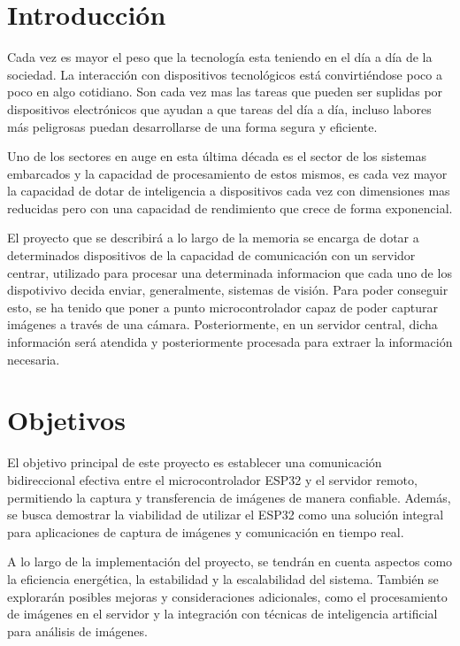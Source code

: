 
\section{Introducción}
Cada vez es mayor el peso que la tecnología esta teniendo en el día a día de la sociedad. La interacción con dispositivos tecnológicos está convirtiéndose poco a poco en algo cotidiano. Son cada vez mas las tareas que pueden ser suplidas por dispositivos electrónicos que ayudan a que tareas del día a día, incluso labores más peligrosas puedan desarrollarse de una forma segura y eficiente.

Uno de los sectores en auge en esta última década es el sector de los sistemas embarcados y la capacidad de procesamiento de estos mismos, es cada vez mayor la capacidad de dotar de inteligencia a dispositivos cada vez con dimensiones mas reducidas pero con una capacidad de rendimiento que crece de forma exponencial.

El proyecto que se describirá a lo largo de la memoria se encarga de dotar a determinados dispositivos de la capacidad de comunicación con un servidor centrar, utilizado para procesar una determinada informacion que cada uno de los dispotivivo decida enviar, generalmente, sistemas de visión. Para poder conseguir esto, se ha tenido que poner a punto microcontrolador capaz de poder capturar imágenes a través de una cámara. Posteriormente, en un servidor central, dicha información será atendida y posteriormente procesada para extraer la información necesaria.

\section{Objetivos}
El objetivo principal de este proyecto es establecer una comunicación bidireccional efectiva entre el microcontrolador ESP32 y el servidor remoto, permitiendo la captura y transferencia de imágenes de manera confiable. Además, se busca demostrar la viabilidad de utilizar el ESP32 como una solución integral para aplicaciones de captura de imágenes y comunicación en tiempo real.

A lo largo de la implementación del proyecto, se tendrán en cuenta aspectos como la eficiencia energética, la estabilidad y la escalabilidad del sistema. También se explorarán posibles mejoras y consideraciones adicionales, como el procesamiento de imágenes en el servidor y la integración con técnicas de inteligencia artificial para análisis de imágenes.

